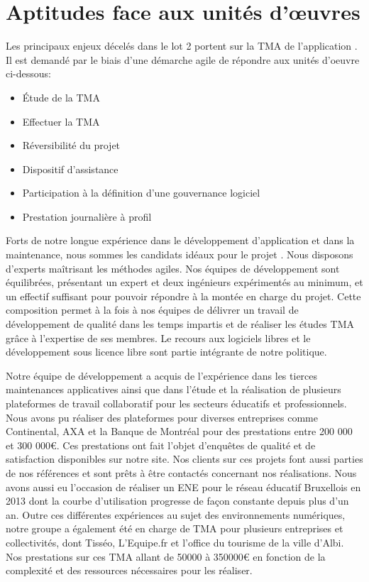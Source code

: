 \section{Aptitudes face aux unités d'œuvres}
	Les principaux enjeux décelés dans le lot 2 portent sur la TMA de l’application \correlyce{}. Il est demandé par le biais d’une démarche agile de répondre aux unités d’oeuvre ci-dessous: 
	
	\begin{itemize}
		\item Étude de la TMA
		\item Effectuer la TMA
		\item Réversibilité du projet
		\item Dispositif d’assistance
		\item Participation à la définition d’une gouvernance logiciel
		\item Prestation journalière à profil 
	\end{itemize}

	Forts de notre longue expérience dans le développement d’application et dans la maintenance, nous sommes les candidats idéaux pour le projet \correlyce{}. Nous disposons d’experts maîtrisant les méthodes agiles. Nos équipes de développement sont équilibrées, présentant un expert et deux ingénieurs expérimentés au minimum, et un effectif suffisant pour pouvoir répondre à la montée en charge du projet. Cette composition permet à la fois à nos équipes de délivrer un travail de développement de qualité dans les temps impartis et de réaliser les études TMA grâce à l’expertise de ses membres.  Le recours aux logiciels libres et le développement sous licence libre sont partie intégrante de notre politique.
	
	Notre équipe de développement a acquis de l’expérience dans les tierces maintenances applicatives ainsi que dans l’étude et la réalisation de plusieurs plateformes de travail collaboratif pour les secteurs éducatifs et professionnels. Nous avons pu réaliser des plateformes pour diverses entreprises comme Continental, AXA et la Banque de Montréal pour des prestations entre 200 000 et 300 000\euro{}. Ces prestations ont fait l’objet d’enquêtes de qualité et de satisfaction disponibles sur notre site. Nos clients sur ces projets font aussi parties de nos références et sont prêts à être contactés concernant nos réalisations. Nous avons aussi eu l’occasion de réaliser un ENE pour le réseau éducatif Bruxellois en 2013 dont la courbe d’utilisation progresse de façon constante depuis plus d’un an. Outre ces différentes expériences au sujet des environnements numériques, notre groupe a également été en charge de TMA pour plusieurs entreprises et collectivités, dont Tisséo, L'Equipe.fr et l’office du tourisme de la ville d’Albi. Nos prestations sur ces TMA allant de 50000 à 350000\euro{} en fonction de la complexité et des ressources nécessaires pour les réaliser.
	
